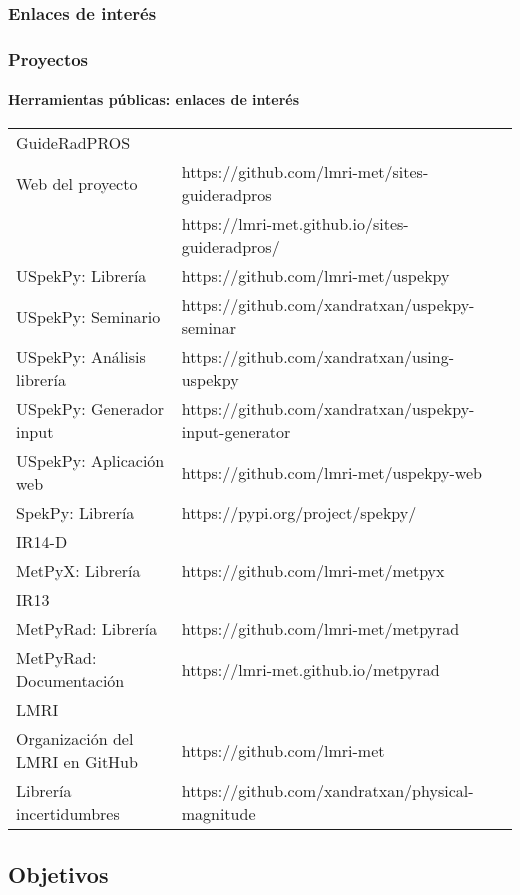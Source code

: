 \documentclass{beamer}
\begin{document}
	\subsubsection{Enlaces de interés}
	
	\begin{frame}
		\frametitle{Proyectos}
		\framesubtitle{Herramientas públicas: enlaces de interés}
		\centering
		\scriptsize
		\begin{tabular}{ll}			
			\rowcolor{blue!40}
			{\color{white}GuideRadPROS}&\\
			Web del proyecto&https://github.com/lmri-met/sites-guideradpros\\
			&https://lmri-met.github.io/sites-guideradpros/\\
			USpekPy: Librería&https://github.com/lmri-met/uspekpy\\
			USpekPy: Seminario&https://github.com/xandratxan/uspekpy-seminar\\
			USpekPy: Análisis librería&https://github.com/xandratxan/using-uspekpy\\
			USpekPy: Generador input&https://github.com/xandratxan/uspekpy-input-generator\\
			USpekPy: Aplicación web&https://github.com/lmri-met/uspekpy-web\\
			SpekPy: Librería&https://pypi.org/project/spekpy/\\
			\rowcolor{blue!40}
			{\color{white}IR14-D}&\\
			MetPyX: Librería&https://github.com/lmri-met/metpyx\\
			\rowcolor{blue!40}
			{\color{white}IR13}&\\
			MetPyRad: Librería&https://github.com/lmri-met/metpyrad\\
			MetPyRad: Documentación&https://lmri-met.github.io/metpyrad\\
			\rowcolor{blue!40}
			{\color{white}LMRI}&\\
			Organización del LMRI en GitHub&https://github.com/lmri-met\\
			Librería incertidumbres&https://github.com/xandratxan/physical-magnitude\\
		\end{tabular}
	\end{frame}
	
	\subsection{Objetivos}
\end{document}
